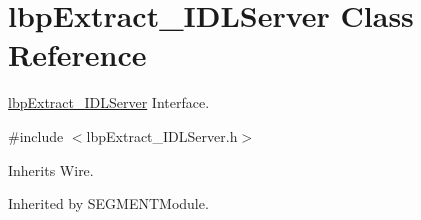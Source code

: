 \section{lbp\+Extract\+\_\+\+I\+D\+L\+Server Class Reference}
\label{classlbpExtract__IDLServer}


\hyperlink{classlbpExtract__IDLServer}{lbp\+Extract\+\_\+\+I\+D\+L\+Server} Interface.  




{\ttfamily \#include $<$lbp\+Extract\+\_\+\+I\+D\+L\+Server.\+h$>$}



Inherits Wire.



Inherited by S\+E\+G\+M\+E\+N\+T\+Module.

